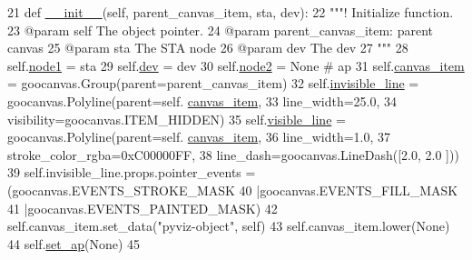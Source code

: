 \begin{DoxyCode}
21     \textcolor{keyword}{def }\hyperlink{classwifi__intrastructure__link_1_1WifiLink_afdfd3aef6448315e67ebe5a619ab1aeb}{\_\_init\_\_}(self, parent\_canvas\_item, sta, dev):
22         \textcolor{stringliteral}{"""! Initialize function.}
23 \textcolor{stringliteral}{        @param self The object pointer.}
24 \textcolor{stringliteral}{        @param parent\_canvas\_item: parent canvas}
25 \textcolor{stringliteral}{        @param sta The STA node}
26 \textcolor{stringliteral}{        @param dev The dev}
27 \textcolor{stringliteral}{        """}
28         self.\hyperlink{classwifi__intrastructure__link_1_1WifiLink_a09f701c48feb76a7326cd9ab0c9e9ef9}{node1} = sta
29         self.\hyperlink{classwifi__intrastructure__link_1_1WifiLink_a08172890e1ead1ce5c3e03eaa166634a}{dev} = dev
30         self.\hyperlink{classwifi__intrastructure__link_1_1WifiLink_ae2a6891c2b8c472b6125b5414b0be1ca}{node2} = \textcolor{keywordtype}{None} \textcolor{comment}{# ap}
31         self.\hyperlink{classwifi__intrastructure__link_1_1WifiLink_a45fdec8fed6b8aa9d749bfe55485d49e}{canvas\_item} = goocanvas.Group(parent=parent\_canvas\_item)
32         self.\hyperlink{classwifi__intrastructure__link_1_1WifiLink_adc2c71fbcb45b36e9f03b7150e6868fa}{invisible\_line} = goocanvas.Polyline(parent=self.
      \hyperlink{classwifi__intrastructure__link_1_1WifiLink_a45fdec8fed6b8aa9d749bfe55485d49e}{canvas\_item},
33                                                  line\_width=25.0,
34                                                  visibility=goocanvas.ITEM\_HIDDEN)
35         self.\hyperlink{classwifi__intrastructure__link_1_1WifiLink_a93c4314f7e592781ef343014db420842}{visible\_line} = goocanvas.Polyline(parent=self.
      \hyperlink{classwifi__intrastructure__link_1_1WifiLink_a45fdec8fed6b8aa9d749bfe55485d49e}{canvas\_item},
36                                               line\_width=1.0,
37                                               stroke\_color\_rgba=0xC00000FF,
38                                               line\_dash=goocanvas.LineDash([2.0, 2.0 ]))
39         self.invisible\_line.props.pointer\_events = (goocanvas.EVENTS\_STROKE\_MASK
40                                                     |goocanvas.EVENTS\_FILL\_MASK
41                                                     |goocanvas.EVENTS\_PAINTED\_MASK)
42         self.canvas\_item.set\_data(\textcolor{stringliteral}{"pyviz-object"}, self)
43         self.canvas\_item.lower(\textcolor{keywordtype}{None})
44         self.\hyperlink{classwifi__intrastructure__link_1_1WifiLink_afaa1042fd08a883313440a580671d05e}{set\_ap}(\textcolor{keywordtype}{None})
45 
\end{DoxyCode}


